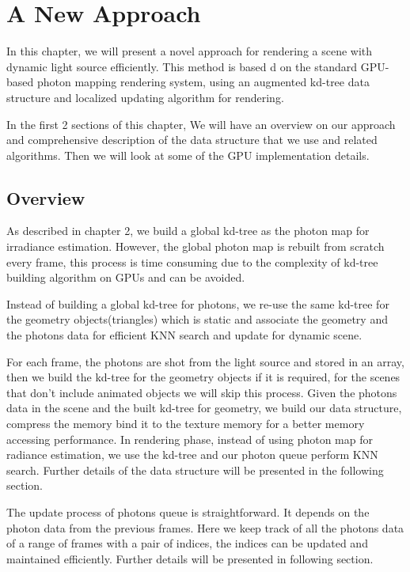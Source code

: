 \chapter{A New Approach}

In this chapter, we will present a novel approach for rendering a scene with dynamic light source efficiently. This method is based d on the standard GPU-based photon mapping rendering system, using an augmented kd-tree data structure and localized updating algorithm for rendering.  

In the first 2 sections of this chapter, We will have an overview on our approach and comprehensive description of the data structure that we use and related algorithms. Then we will look at some of the GPU implementation details. 

\section{Overview} 

As described in chapter 2, we build a global kd-tree as the photon map for irradiance estimation. However, the global photon map is rebuilt from scratch every frame, this process is time consuming due to the complexity of kd-tree building algorithm on GPUs and can be avoided. 

Instead of building a global kd-tree for photons, we re-use the same kd-tree for the geometry objects(triangles) which is static and associate the geometry and the photons data for efficient KNN search and update for dynamic scene. 

For each frame, the photons are shot from the light source and stored in an array, then we build the kd-tree for the geometry objects if it is required, for the scenes that don't include animated objects we will skip this process. Given the photons data in the scene and the built kd-tree for geometry, we build our data structure, compress the memory bind it to the texture memory for a better memory accessing performance. In rendering phase, instead of using photon map for radiance estimation, we use the kd-tree and our photon queue perform KNN search. Further details of the data structure will be presented in the following section. 

The update process of photons queue is straightforward. It depends on the photon data from the previous frames. Here we keep track of all the photons data of a range of frames with a pair of indices, the indices can be updated and maintained efficiently. Further details will be presented in following section.  


